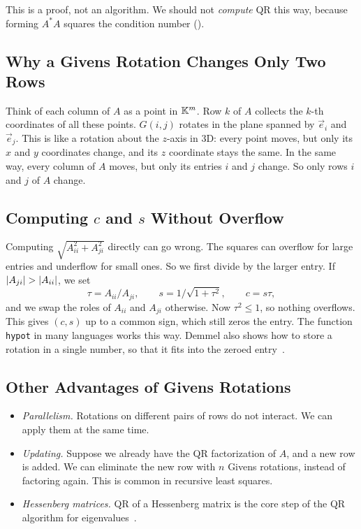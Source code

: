 This is a proof, not an algorithm. We should not \emph{compute} QR this way, because forming $A^\ast A$ squares the condition number ().

\subsection{Why a Givens Rotation Changes Only Two Rows}
\label{sec:givens-two-rows}
Think of each column of $A$ as a point in $\mathbb{K}^m$. Row $k$ of $A$ collects the $k$-th coordinates of all these points. $G(i, j)$ rotates in the plane spanned by $\vec{e}_i$ and $\vec{e}_j$. This is like a rotation about the $z$-axis in 3D: every point moves, but only its $x$ and $y$ coordinates change, and its $z$ coordinate stays the same. In the same way, every column of $A$ moves, but only its entries $i$ and $j$ change. So only rows $i$ and $j$ of $A$ change.

\subsection{Computing $c$ and $s$ Without Overflow}

Computing $\sqrt{A_{ii}^2 + A_{ji}^2}$ directly can go wrong. The squares can overflow for large entries and underflow for small ones. So we first divide by the larger entry. If $\left\lvert A_{ji} \right\rvert > \left\lvert A_{ii} \right\rvert$, we set
\begin{equation*}
  \tau = A_{ii}/A_{ji}, \qquad s = 1/\sqrt{1 + \tau^2}, \qquad c = s\tau,
\end{equation*}
and we swap the roles of $A_{ii}$ and $A_{ji}$ otherwise. Now $\tau^2 \le 1$, so nothing overflows. This gives $(c, s)$ up to a common sign, which still zeros the entry. The function \texttt{hypot} in many languages works this way. Demmel also shows how to store a rotation in a single number, so that it fits into the zeroed entry~\cite[\S3.4.2]{Demmel}.

\subsection{Other Advantages of Givens Rotations}

\begin{itemize}
  \item \emph{Parallelism.} Rotations on different pairs of rows do not interact. We can apply them at the same time.
  \item \emph{Updating.} Suppose we already have the QR factorization of $A$, and a new row is added. We can eliminate the new row with $n$ Givens rotations, instead of factoring again. This is common in recursive least squares.
  \item \emph{Hessenberg matrices.} QR of a Hessenberg matrix is the core step of the QR algorithm for eigenvalues~\cite[Lectures 28--29]{TB}.
\end{itemize}

